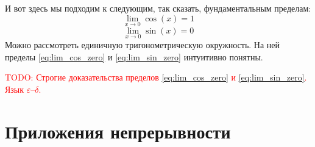 \documentclass[a4paper, 12pt, final]{article}
\begin{document}
И вот здесь мы подходим к следующим, так сказать, фундаментальным пределам:
\begin{equation}
    \lim_{x \to 0} \cos(x) = 1
    \label{eq:lim_cos_zero}
\end{equation}
\begin{equation}
    \lim_{x \to 0} \sin(x) = 0
    \label{eq:lim_sin_zero}
\end{equation}
Можно рассмотреть единичную тригонометрическую окружность.
На ней пределы \eqref{eq:lim_cos_zero} и \eqref{eq:lim_sin_zero} интуитивно понятны.

\textcolor{red}{
    TODO: Строгие доказательства пределов \eqref{eq:lim_cos_zero} и \eqref{eq:lim_sin_zero}. Язык $\varepsilon$--$\delta$.
}

\section{Приложения непрерывности}

{}

\nocite{Bermant}
\nocite{Fikhtengolts}



\end{document}
